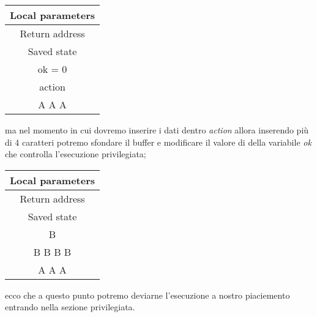 \begin{center}
    \begin{table}[h!]
        \centering
        \begin{tabular}{|c|}
            \hline
            Local parameters \\
            \hline
            Return address \\
            \hline
            Saved state \\
            \hline
            ok = 0 \\
            \hline
            action \\
            \hline
            A A A \\
            \hline
        \end{tabular}
    \end{table}
\end{center}
ma nel momento in cui dovremo inserire i dati dentro \textit{action} allora inserendo più di 4 caratteri potremo sfondare il buffer e modificare il valore di della variabile \textit{ok} che controlla l'esecuzione privilegiata;
\begin{center}
    \begin{table}[h!]
        \centering
        \begin{tabular}{|c|}
            \hline
            Local parameters \\
            \hline
            Return address \\
            \hline
            Saved state \\
            \hline
            B \\
            \hline
            B B B B \\
            \hline
            A A A \\
            \hline
        \end{tabular}
    \end{table}
\end{center}
ecco che a questo punto potremo deviarne l'esecuzione a nostro piaciemento entrando nella sezione privilegiata.

